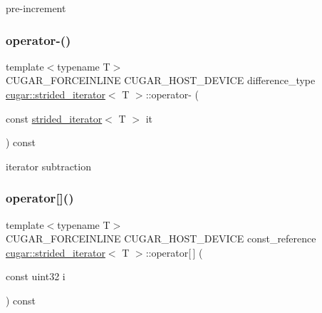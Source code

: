pre-\/increment \mbox{\label{structcugar_1_1strided__iterator_aeaf1a5c948f85a27d47739233ff896ef}} 
\subsubsection{\texorpdfstring{operator-\/()}{operator-()}}
{\footnotesize\ttfamily template$<$typename T$>$ \\
C\+U\+G\+A\+R\+\_\+\+F\+O\+R\+C\+E\+I\+N\+L\+I\+NE C\+U\+G\+A\+R\+\_\+\+H\+O\+S\+T\+\_\+\+D\+E\+V\+I\+CE difference\+\_\+type \hyperlink{structcugar_1_1strided__iterator}{cugar\+::strided\+\_\+iterator}$<$ T $>$\+::operator-\/ (\begin{DoxyParamCaption}\item[{const \hyperlink{structcugar_1_1strided__iterator}{strided\+\_\+iterator}$<$ T $>$}]{it }\end{DoxyParamCaption}) const\hspace{0.3cm}{\ttfamily [inline]}}

iterator subtraction \mbox{\label{structcugar_1_1strided__iterator_a81a1d3212d3e701091eab2dc7c71e8bf}} 
\subsubsection{\texorpdfstring{operator[]()}{operator[]()}\hspace{0.1cm}{\footnotesize\ttfamily [1/2]}}
{\footnotesize\ttfamily template$<$typename T$>$ \\
C\+U\+G\+A\+R\+\_\+\+F\+O\+R\+C\+E\+I\+N\+L\+I\+NE C\+U\+G\+A\+R\+\_\+\+H\+O\+S\+T\+\_\+\+D\+E\+V\+I\+CE const\+\_\+reference \hyperlink{structcugar_1_1strided__iterator}{cugar\+::strided\+\_\+iterator}$<$ T $>$\+::operator\mbox{[}$\,$\mbox{]} (\begin{DoxyParamCaption}\item[{const uint32}]{i }\end{DoxyParamCaption}) const\hspace{0.3cm}{\ttfamily [inline]}}


